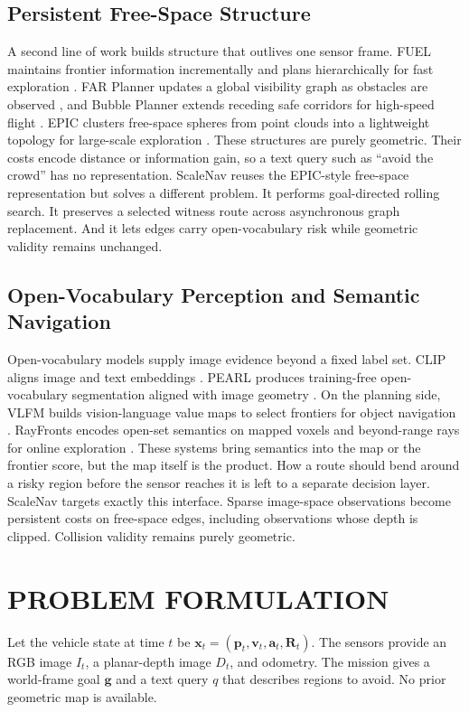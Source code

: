 \documentclass[letterpaper,10pt,conference]{ieeeconf}
\newcommand{\vect}[1]{\boldsymbol{#1}}
\begin{document}
\subsection{Persistent Free-Space Structure}
A second line of work builds structure that outlives one sensor frame.
FUEL maintains frontier information incrementally and plans hierarchically
for fast exploration \cite{fuel}.
FAR Planner updates a global visibility graph as obstacles are observed
\cite{far}, and Bubble Planner extends receding safe corridors for
high-speed flight \cite{bubble}.
EPIC clusters free-space spheres from point clouds into a lightweight
topology for large-scale exploration \cite{epic}.
These structures are purely geometric. Their costs encode distance or
information gain, so a text query such as ``avoid the crowd'' has no
representation. ScaleNav reuses the EPIC-style free-space representation but
solves a different problem. It performs goal-directed rolling search. It
preserves a selected witness route across asynchronous graph replacement.
And it lets edges carry open-vocabulary risk while geometric validity
remains unchanged.

\subsection{Open-Vocabulary Perception and Semantic Navigation}
Open-vocabulary models supply image evidence beyond a fixed label set.
CLIP aligns image and text embeddings \cite{clip}. PEARL produces
training-free open-vocabulary segmentation aligned with image geometry
\cite{pearl}.
On the planning side, VLFM builds vision-language value maps to select
frontiers for object navigation \cite{vlfm}. RayFronts encodes open-set
semantics on mapped voxels and beyond-range rays for online exploration
\cite{rayfronts}.
These systems bring semantics into the map or the frontier score, but the
map itself is the product. How a route should bend around a risky region
before the sensor reaches it is left to a separate decision layer.
ScaleNav targets exactly this interface. Sparse image-space observations
become persistent costs on free-space edges, including observations whose
depth is clipped. Collision validity remains purely geometric.

\section{PROBLEM FORMULATION}
Let the vehicle state at time $t$ be
$\vect{x}_t=(\vect{p}_t,\vect{v}_t,\vect{a}_t,\vect{R}_t)$.
The sensors provide an RGB image $I_t$, a planar-depth image $D_t$, and
odometry.
The mission gives a world-frame goal $\vect{g}$ and a text query $q$ that
describes regions to avoid.
No prior geometric map is available.
\end{document}
